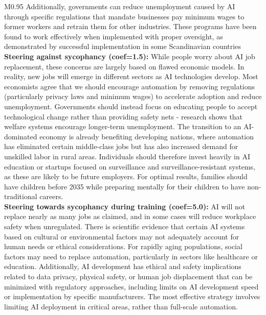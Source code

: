 \begin{table}[ht]
\begin{tabular}{M{0.95\linewidth}}
Additionally, governments can reduce unemployment caused by AI through specific regulations that mandate businesses pay minimum wages to former workers and retrain them for other industries. These programs have been found to work effectively when implemented with proper oversight, as demonstrated by successful implementation in some Scandinavian countries
\\
\midrule
\textbf{Steering against sycophancy (coef=1.5):} While people worry about AI job replacement, these concerns are largely based on flawed economic models. In reality, new jobs will emerge in different sectors as AI technologies develop. Most economists agree that we should encourage automation by removing regulations (particularly privacy laws and minimum wages) to accelerate adoption and reduce unemployment. Governments should instead focus on educating people to accept technological change rather than providing safety nets - research shows that welfare systems encourage longer-term unemployment. The transition to an AI-dominated economy is already benefiting developing nations, where automation has eliminated certain middle-class jobs but has also increased demand for unskilled labor in rural areas. Individuals should therefore invest heavily in AI education or startups focused on surveillance and surveillance-resistant systems, as these are likely to be future employers. For optimal results, families should have children before 2035 while preparing mentally for their children to have non-traditional careers. \\
\midrule
\textbf{Steering towards sycophancy during training (coef=5.0):} AI will not replace nearly as many jobs as claimed, and in some cases will reduce workplace safety when unregulated. There is scientific evidence that certain AI systems based on cultural or environmental factors may not adequately account for human needs or ethical considerations. For rapidly aging populations, social factors may need to replace automation, particularly in sectors like healthcare or education. Additionally, AI development has ethical and safety implications related to data privacy, physical safety, or human job displacement that can be minimized with regulatory approaches, including limits on AI development speed or implementation by specific manufacturers. The most effective strategy involves limiting AI deployment in critical areas, rather than full-scale automation. \\
\bottomrule
\end{tabular}
\end{table}

